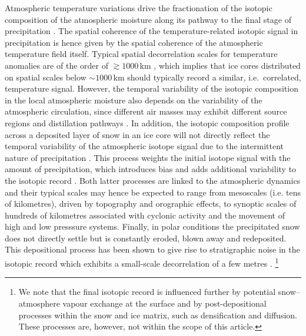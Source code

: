 \documentclass[cp, manuscript]{copernicus}
\begin{document}
Atmospheric temperature variations drive the fractionation of the isotopic
composition of the atmospheric moisture along its pathway to the final stage of
precipitation \citep{Dansgaard1964,Jouzel1984}. The spatial coherence
of the temperature-related isotopic signal in precipitation is hence given by
the spatial coherence of the atmospheric temperature field itself. Typical
spatial decorrelation scales for temperature anomalies are of the order of
$\gtrsim1000$\,km \citep{Jones1997}, which implies that ice cores distributed on
spatial scales below $\sim 1000$\,km should typically record a similar,
i.e.\ correlated, temperature signal. However, the temporal variability of the
isotopic composition in the local atmospheric moisture also depends on the
variability of the atmospheric circulation, since different air masses may
exhibit different source regions and distillation pathways \citep{Schlosser2004,
Sodemann2008a,Birks2009,Kuttel2012}. In addition, the isotopic composition
profile across a deposited layer of snow in an ice core will not directly
reflect the temporal variability of the atmospheric isotope signal due to the
intermittent nature of precipitation \citep{Schleiss2015}. This process weights
the initial isotope signal with the amount of precipitation, which introduces
bias \citep{Steig1994,Laepple2011a} and adds additional variability to the
isotopic record \citep{Persson2011,Casado2019}. Both latter processes are linked
to the atmospheric dynamics and their typical scales may hence be expected to
range from mesoscales (i.e. tens of kilometres), driven by topography and
orographic effects, to synoptic scales of hundreds of kilometres associated with
cyclonic activity and the movement of high and low presssure systems. Finally,
in polar conditions the precipitated snow does not directly settle but is
constantly eroded, blown away and redeposited. This depositional process has
been shown to give rise to stratigraphic noise in the isotopic record
\citep{Fisher1985,Munch2016} which exhibits a small-scale decorrelation of a few
metres \citep{Munch2016}.%
\footnote{We note that the final isotopic record is influenced further by
  potential snow--atmosphere vapour exchange at the surface and by
  post-depositional processes within the snow and ice matrix, such as
  densification and diffusion. These processes are, however, not within the
  scope of this article.}
\end{document}
